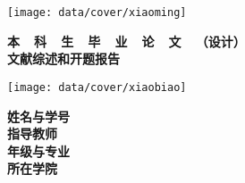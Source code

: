\thispagestyle{empty}

{
\setlength{\parindent}{0em}
\renewcommand{\baselinestretch}{2}

\vspace*{-7mm}

\begin{center}
  \texttt{[image: data/cover/xiaoming]}
\end{center}

\vspace{-1mm}

{
\renewcommand{\baselinestretch}{1.8}
\heiti\xiaoyi\bfseries
\centering
本~~科~~生~~毕~~业~~论~~文~~（设计） \\
文献综述和开题报告 \par
}

\vspace{4em}

\begin{center}
  \texttt{[image: data/cover/xiaobiao]}
\end{center}

\vspace{3em}

{
\renewcommand{\baselinestretch}{1.65}
\stfangsong\sanhao\bfseries
\centering
姓名与学号 \;\;\; \underline{\makebox[12em]{\zjuauthornamec}} \vspace{1em}  \\
指导教师 \;\;\;\;\;\; \underline{\makebox[12em]{\zjumentorc}} \vspace{1em}  \\
年级与专业 \;\;\; \underline{\makebox[12em]{\zjugrade~~\zjumajor}} \vspace{1em}  \\
所在学院 \;\;\;\;\;\; \underline{\makebox[12em]{\zjucollegec}} \par
}
}

